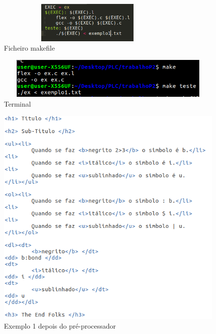 \documentclass{report}
\begin{document}
\begin{figure}[h]
\centering
\includegraphics[width=9cm,height= 2cm]{makefile.png}
\caption{Ficheiro makefile}
\label{makefile}
\end{figure}

\begin{figure}[h]
\centering
\includegraphics[width=12cm,height= 2cm]{terminal.png}
\caption{Terminal}
\label{Terminal}
\end{figure}
\begin{figure}[h]
\centering
\includegraphics[scale= 0.5]{exemplo1html.png}
\caption{Exemplo 1 depois do pré-processador}
\label{Ficheiro em HTML}
\end{figure}
\end{document}
